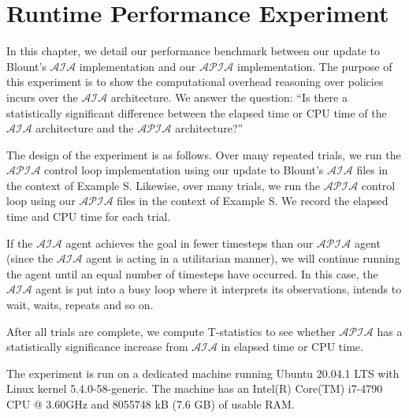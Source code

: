 \chapter{Runtime Performance Experiment}

%

In this chapter, we detail our performance benchmark between our update to Blount's $\mathcal{AIA}$ implementation and our $\mathcal{APIA}$ implementation.
The purpose of this experiment is to show the computational overhead reasoning over policies incurs over the $\mathcal{AIA}$ architecture.
We answer the question: ``Is there a statistically significant difference between the elapsed time or CPU time of the $\mathcal{AIA}$ architecture and the $\mathcal{APIA}$ architecture?''

The design of the experiment is as follows.
Over many repeated trials, we run the $\mathcal{APIA}$ control loop implementation using our update to Blount's $\mathcal{AIA}$ files in the context of Example S.
Likewise, over many trials, we run the $\mathcal{APIA}$ control loop using our $\mathcal{APIA}$ files in the context of Example S.
We record the elapsed time and CPU time for each trial.

If the $\mathcal{AIA}$ agent achieves the goal in fewer timesteps than our $\mathcal{APIA}$ agent (since the $\mathcal{AIA}$ agent is acting in a utilitarian manner), we will continue running the agent until an equal number of timesteps have occurred.
In this case, the $\mathcal{AIA}$ agent is put into a busy loop where it interprets its observations, intends to wait, waits, repeats and so on.

After all trials are complete, we compute T-statistics to see whether $\mathcal{APIA}$ has a statistically significance increase from $\mathcal{AIA}$ in elapsed time or CPU time.

The experiment is run on a dedicated machine running Ubuntu 20.04.1 LTS with Linux kernel 5.4.0-58-generic.
The machine has an Intel(R) Core(TM) i7-4790 CPU @ 3.60GHz and 8055748 kB (7.6 GB) of usable RAM.
